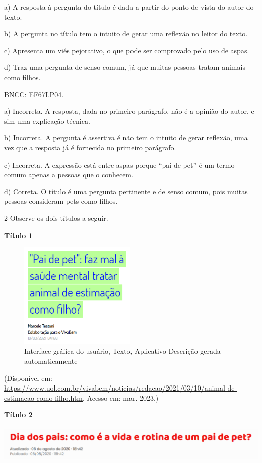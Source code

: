 {a) A resposta à pergunta do título é dada a partir do ponto de vista do
autor do texto.

b) A pergunta no título tem o intuito de gerar uma reflexão no leitor do
texto.

c) Apresenta um viés pejorativo, o que pode ser comprovado pelo uso de
aspas.

d) Traz uma pergunta de senso comum, já que muitas pessoas tratam
animais como filhos.

BNCC: EF67LP04.

a) Incorreta. A resposta, dada no primeiro parágrafo, não é a opinião do
autor, e sim uma explicação técnica.

b) Incorreta. A pergunta é assertiva é não tem o intuito de gerar
reflexão, uma vez que a resposta já é fornecida no primeiro parágrafo.

c) Incorreta. A expressão está entre aspas porque ``pai de pet'' é um
termo comum apenas a pessoas que o conhecem.

d) Correta. O título é uma pergunta pertinente e de senso comum, pois
muitas pessoas consideram pets como filhos.

\num{2} Observe os dois títulos a seguir.

\textbf{Título 1}

\begin{figure}
\centering
\includegraphics[width=2.20141in,height=2.00758in]{./imgSAEB_6_POR/media/image23.png}
\caption{Interface gráfica do usuário, Texto, Aplicativo Descrição
gerada automaticamente}
\end{figure}

(Disponível em:
\url{https://www.uol.com.br/vivabem/noticias/redacao/2021/03/10/animal-de-estimacao-como-filho.htm}.
Acesso em: mar. 2023.)

\textbf{Título 2}

\includegraphics[width=5.90556in,height=0.70764in]{./imgSAEB_6_POR/media/image24.png}

}
